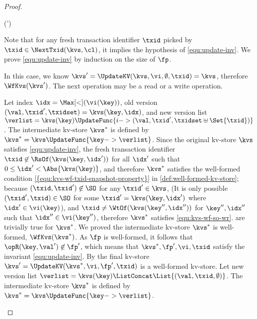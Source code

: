 \begin{proof}
\begin{Formulae}
\begin{Formula}
        \implies \WfKvs(\kvs')
\end{Formula}
\label{equ:update-inv}
\end{Formulae}
Note that for any fresh transaction identifier \( \txid \) picked by \( \txid \in \NextTxid(\kvs,\cl) \),
it implies the hypothesis of \cref{equ:update-inv}.
We prove \cref{equ:update-inv} by induction on the size of \( \fp \).
\begin{enumerate}
    In this case, we know \( \kvs' = \UpdateKV(\kvs,\vi,\emptyset,\txid) = \kvs \), 
    therefore \( \WfKvs(\kvs') \).
    The next operation may be a read or a write operation.
    \begin{enumerate}
        Let index \( \idx = \Max[<](\vi(\key)) \), 
        old version \( (\val,\txid',\txidset) = \kvs(\key,\idx) \),
        and new version list \( \verlist = \kvs(\key)\UpdateFunc{i -> (\val, \txid', \txidset \uplus \Set{\txid})} \).
        The intermediate kv-store \( \kvs^* \) is defined by \( \kvs^* = \kvs\UpdateFunc{\key -> \verlist} \).
        Since the original kv-store \( \kvs \) satisfies \cref{equ:update-inv},
        the fresh transaction identifier \( \txid \not\in \RsOf(\kvs(\key,\idx'))\) 
        for all \( \idx' \) such that \( 0 \leq \idx' < \Abs{\kvs(\key)} \),
        and therefore  \(\kvs^*\) satisfies  the well-formed condition 
        \cref{{equ:kvs-wf-txid-snapshot-property}} in \cref{def:well-formed-kv-store}; 
        because \( (\txid, \txid') \not\in \SO \) for any \( \txid' \in \kvs \), 
        (It is only possible \( (\txid', \txid) \in \SO \) 
        for some \( \txid' = \kvs(\key,\idx')\) where \( \idx' \in \vi(\key) \)), 
        and \( \txid \neq \WtOf(\kvs(\key'',\idx'')) \) for \( \key'',\idx'' \) such that \( \idx'' \in \vi(\key'')\),
        therefore \( \kvs^* \) satisfies \cref{equ:kvs-wf-so-wr}.
         are trivially true for \( \kvs^* \).
        We proved the intermediate kv-store \( \kvs^*\) is well-formed, \( \WfKvs(\kvs^*)\).
        As \( \fp \) is well-formed, it follows that \( \opR(\key,\val') \not\in \fp' \),
        which means that \( \kvs^*, \fp',\vi,\txid \) satisfy the invariant \cref{equ:update-inv}.
        By \ih the final kv-store \( \kvs' = \UpdateKV(\kvs^*,\vi,\fp',\txid)\)  is a well-formed kv-store.
        Let new version list \( \verlist = \kvs(\key)\ListConcat \List{ (\val, \txid, \emptyset)} \).
        The intermediate kv-store \( \kvs^* \) is defined by \( \kvs^* = \kvs\UpdateFunc{\key -> \verlist} \).

\end{enumerate}
\end{enumerate}
\end{proof}
